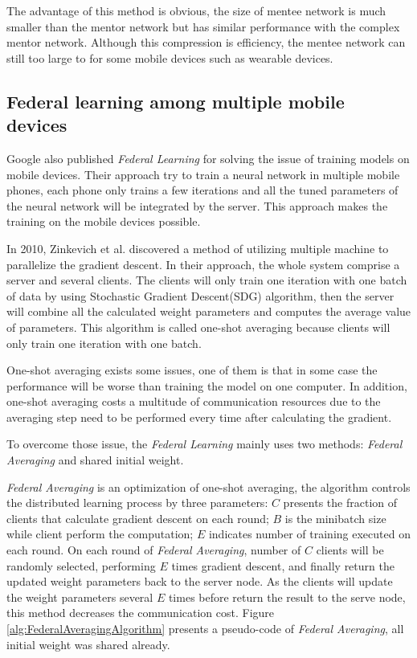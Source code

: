\documentclass[article]{aaltoseries}
\begin{document}
The advantage of this method is obvious, 
the size of mentee network is much smaller than the mentor network but has similar performance
with the complex mentor network. 
Although this compression is efficiency, the mentee network can still too large to for some mobile
devices such as wearable devices.


\subsection{Federal learning among multiple mobile devices}

Google also published \emph{Federal Learning} for solving the issue of training models on mobile devices.
Their approach try to train a neural network in multiple mobile phones, each phone only trains a few iterations
and all the tuned parameters of the neural network will be integrated by the server. 
This approach makes the training on the mobile devices possible.

In 2010, Zinkevich et al.\cite{Zinkevich2010} discovered a method of utilizing multiple machine to parallelize the gradient descent.
In their approach, the whole system comprise a server and several clients. 
The clients will only train one iteration with one batch of data by using Stochastic Gradient Descent(SDG) algorithm, 
then the server will combine all the calculated weight parameters and computes the average value of parameters.
This algorithm is called one-shot averaging because clients will only train one iteration with one batch.

One-shot averaging exists some issues, one of them is that in some case the performance will be worse than training
the model on one computer\cite{Shamir2013}. In addition, one-shot averaging costs a multitude of communication resources
due to the averaging step need to be performed every time after calculating the gradient.


To overcome those issue, the \emph{Federal Learning} mainly uses two methods: \emph{Federal Averaging} 
and shared initial weight.

\emph{Federal Averaging} is an optimization of one-shot averaging, the algorithm controls the distributed learning process by
three parameters: $C$ presents the fraction of clients that calculate gradient descent on each round; $B$ is the minibatch size
while client perform the computation; $E$ indicates number of training executed on each round.
On each round of \emph{Federal Averaging}, number of $C$ clients will be randomly selected, performing $E$ times gradient
descent, and finally return the updated weight parameters back to the server node. As the clients will update the 
weight parameters several $E$ times before return the result to the serve node, this method decreases the communication cost.
Figure \ref{alg:FederalAveragingAlgorithm} presents a pseudo-code of \emph{Federal Averaging}, all initial weight was shared already.
\end{document}
